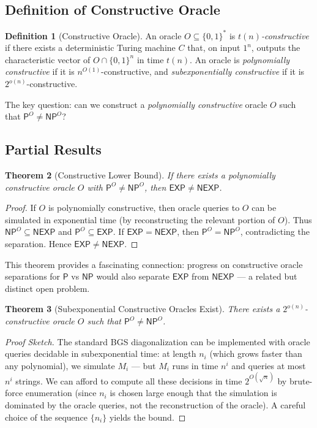 \documentclass[11pt,a4paper]{article}
\theoremstyle{plain}
\newtheorem{theorem}{Theorem}[section]
\theoremstyle{definition}
\newtheorem{definition}[theorem]{Definition}
\theoremstyle{remark}
\newcommand{\PP}{\mathsf{P}}
\newcommand{\NP}{\mathsf{NP}}
\newcommand{\EXP}{\mathsf{EXP}}
\newcommand{\NEXP}{\mathsf{NEXP}}
\newcommand{\bits}{\{0,1\}}
\newcommand{\bitsstar}{\{0,1\}^*}
\begin{document}
\subsection{Definition of Constructive Oracle}

\begin{definition}[Constructive Oracle]
An oracle $O \subseteq \bitsstar$ is \emph{$t(n)$-constructive} if there exists
a deterministic Turing machine $C$ that, on input $1^n$, outputs the
characteristic vector of $O \cap \bits^n$ in time $t(n)$.  An oracle is
\emph{polynomially constructive} if it is $n^{O(1)}$-constructive, and
\emph{subexponentially constructive} if it is $2^{o(n)}$-constructive.
\end{definition}

The key question: can we construct a \emph{polynomially constructive} oracle $O$
such that $\PP^O \neq \NP^O$?

\subsection{Partial Results}

\begin{theorem}[Constructive Lower Bound]\label{thm:constructive_lb}
If there exists a polynomially constructive oracle $O$ with $\PP^O \neq \NP^O$,
then $\EXP \neq \NEXP$.
\end{theorem}
\begin{proof}
If $O$ is polynomially constructive, then oracle queries to $O$ can be
simulated in exponential time (by reconstructing the relevant portion of $O$).
Thus $\NP^O \subseteq \NEXP$ and $\PP^O \subseteq \EXP$.  If $\EXP = \NEXP$, then
$\PP^O = \NP^O$, contradicting the separation.  Hence $\EXP \neq \NEXP$.
\end{proof}

This theorem provides a fascinating connection: progress on constructive oracle
separations for $\PP$ vs $\NP$ would also separate $\EXP$ from $\NEXP$ — a
related but distinct open problem.

\begin{theorem}[Subexponential Constructive Oracles Exist]\label{thm:subexp_con}
There exists a $2^{o(n)}$-constructive oracle $O$ such that $\PP^O \neq \NP^O$.
\end{theorem}
\begin{proof}[Proof Sketch]
The standard BGS diagonalization can be implemented with oracle queries
decidable in subexponential time: at length $n_i$ (which grows faster than any
polynomial), we simulate $M_i$ — but $M_i$ runs in time $n^i$ and queries at
most $n^i$ strings.  We can afford to compute all these decisions in time
$2^{O(\sqrt{n})}$ by brute-force enumeration (since $n_i$ is chosen large enough
that the simulation is dominated by the oracle queries, not the reconstruction
of the oracle).  A careful choice of the sequence $\{n_i\}$ yields the bound.
\end{proof}
\end{document}
